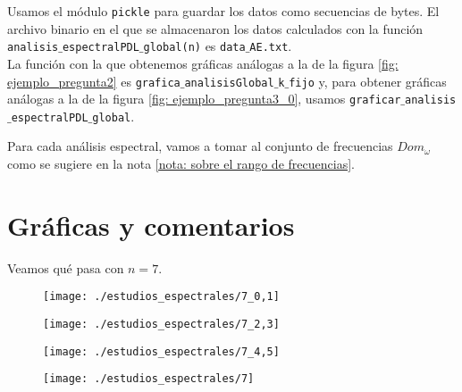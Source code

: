 Usamos el 
módulo \texttt{pickle} para guardar los datos como secuencias
de bytes. El archivo binario en el que se almacenaron los
datos calculados con la función 
\texttt{analisis$\_$espectralPDL$\_$global(n)}
es \texttt{data$\_$AE.txt}. \\

La función con la que obtenemos gráficas análogas 
a la de la figura 
\ref{fig: ejemplo_pregunta2} es
\texttt{grafica$\_$analisisGlobal$\_$k$\_$fijo}
y, para obtener gráficas análogas a la de la figura
\ref{fig: ejemplo_pregunta3_0},
usamos \texttt{graficar$\_$analisis$\_$espectralPDL$\_$global}.

Para cada análisis espectral,
vamos a tomar al conjunto de 
frecuencias $Dom_{\omega}$
como se sugiere en la nota \ref{nota: sobre el rango de frecuencias}.

\section{Gráficas y comentarios}

Veamos qué pasa con $n=7$.

\begin{figure}[H]
	\sidecaption{
	\label{fig: 7_0,1}
	}
	\centering
	\texttt{[image: ./estudios\_espectrales/7\_0,1]} 
\end{figure}	

\begin{figure}[H]
	\centering
	\texttt{[image: ./estudios\_espectrales/7\_2,3]} 
\end{figure}	

\begin{figure}[H]
	\centering
	\texttt{[image: ./estudios\_espectrales/7\_4,5]} 
\end{figure}	


\begin{figure}[H]
	\centering
	\texttt{[image: ./estudios\_espectrales/7]} 
\end{figure}	

